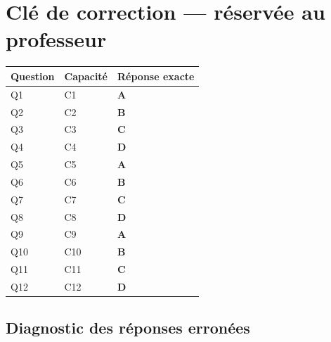 \ifnxVersionProfesseur
\clearpage
\section*{Clé de correction — réservée au professeur}

\begin{center}
\begin{tabular}{lll}
\hline
Question & Capacité & Réponse exacte \\
\hline
Q1 & C1 & \textbf{A} \\
Q2 & C2 & \textbf{B} \\
Q3 & C3 & \textbf{C} \\
Q4 & C4 & \textbf{D} \\
Q5 & C5 & \textbf{A} \\
Q6 & C6 & \textbf{B} \\
Q7 & C7 & \textbf{C} \\
Q8 & C8 & \textbf{D} \\
Q9 & C9 & \textbf{A} \\
Q10 & C10 & \textbf{B} \\
Q11 & C11 & \textbf{C} \\
Q12 & C12 & \textbf{D} \\
\hline
\end{tabular}
\end{center}

\subsection*{Diagnostic des réponses erronées}

